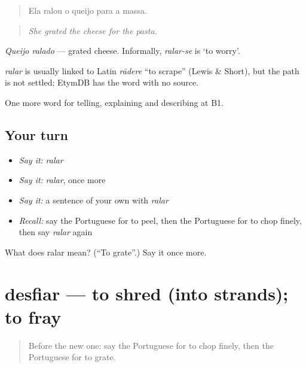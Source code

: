 \begin{quote}
Ela ralou o queijo para a massa.
\end{quote}

\begin{quote}
\emph{She grated the cheese for the pasta.}
\end{quote}

\emph{Queijo ralado} — grated cheese. Informally, \emph{ralar-se} is ‘to worry’.

\begin{cousinweb}
\emph{ralar} is usually linked to Latin \emph{rādere} \textquotedblleft{}to scrape\textquotedblright{} (Lewis \& Short), but the path is not settled; EtymDB has the word with no source.
\end{cousinweb}

\begin{grammarlens}[title={What you've built}]
One more word for telling, explaining and describing at B1.
\end{grammarlens}

\subsection*{Your turn}
\begin{itemize}
\raggedright
  \item \emph{Say it:} \emph{ralar}
  \item \emph{Say it:} \emph{ralar}, once more
  \item \emph{Say it:} a sentence of your own with \emph{ralar}
  \item \emph{Recall:} say the Portuguese for to peel, then the Portuguese for to chop finely, then say \emph{ralar} again
\end{itemize}

\begin{tcolorbox}[breakable,colback=teal!4,colframe=teal!35!black,title={Before you move on}]
What does ralar mean? (\textquotedblleft{}To grate\textquotedblright{}.) Say it once more.
\end{tcolorbox}
\section[desfiar]{desfiar — to shred (into strands); to fray}

\label{lesson:PT-C330-desfiar}



\begin{quote}
Before the new one: say the Portuguese for to chop finely, then the Portuguese for to grate.
\end{quote}

